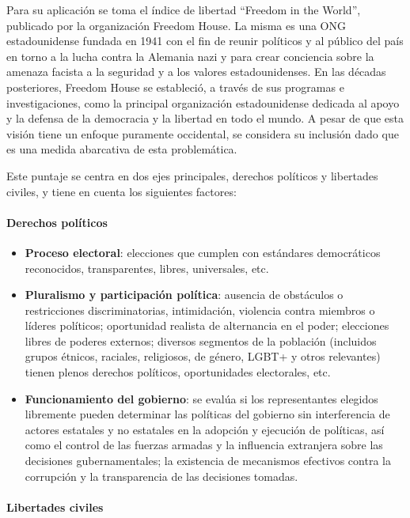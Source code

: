 \documentclass[
  10pt,
]{article}
\begin{document}
Para su aplicación se toma el índice de libertad ``Freedom in the
World'', publicado por la organización Freedom House. La misma es una
ONG estadounidense fundada en 1941 con el fin de reunir políticos y al
público del país en torno a la lucha contra la Alemania nazi y para
crear conciencia sobre la amenaza facista a la seguridad y a los valores
estadounidenses. En las décadas posteriores, Freedom House se
estableció, a través de sus programas e investigaciones, como la
principal organización estadounidense dedicada al apoyo y la defensa de
la democracia y la libertad en todo el mundo. A pesar de que esta visión
tiene un enfoque puramente occidental, se considera su inclusión dado
que es una medida abarcativa de esta problemática.

Este puntaje se centra en dos ejes principales, derechos políticos y
libertades civiles, y tiene en cuenta los siguientes factores:

\paragraph{Derechos políticos}\label{derechos-poluxedticos}

\begin{itemize}
\item
  \textbf{Proceso electoral}: elecciones que cumplen con estándares
  democráticos reconocidos, transparentes, libres, universales, etc.
\item
  \textbf{Pluralismo y participación política}: ausencia de obstáculos o
  restricciones discriminatorias, intimidación, violencia contra
  miembros o líderes políticos; oportunidad realista de alternancia en
  el poder; elecciones libres de poderes externos; diversos segmentos de
  la población (incluidos grupos étnicos, raciales, religiosos, de
  género, LGBT+ y otros relevantes) tienen plenos derechos políticos,
  oportunidades electorales, etc.
\item
  \textbf{Funcionamiento del gobierno}: se evalúa si los representantes
  elegidos libremente pueden determinar las políticas del gobierno sin
  interferencia de actores estatales y no estatales en la adopción y
  ejecución de políticas, así como el control de las fuerzas armadas y
  la influencia extranjera sobre las decisiones gubernamentales; la
  existencia de mecanismos efectivos contra la corrupción y la
  transparencia de las decisiones tomadas.
\end{itemize}

\paragraph{Libertades civiles}\label{libertades-civiles}
\end{document}

